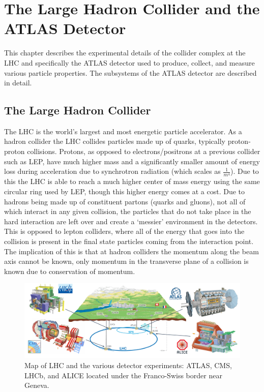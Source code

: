 
\chapter{The Large Hadron Collider and the ATLAS Detector}
\label{ch:LHCDetector}

This chapter describes the experimental details of the collider complex at the LHC and specifically the ATLAS detector used to produce, collect, and measure various particle properties.  The subsystems of the ATLAS detector are described in detail.
\section{The Large Hadron Collider}
\label{Section:LHC}
The LHC is the world's largest and most energetic particle accelerator.  As a hadron collider the LHC collides particles made up of quarks, typically proton-proton collisions.  Protons, as opposed to electrons/positrons at a previous collider such as LEP, have much higher mass and a significantly smaller amount of energy loss during acceleration due to synchrotron radiation (which scales as $\frac{1}{m^4}$).  Due to this the LHC is able to reach a much higher center of mass energy using the same circular ring used by LEP, though this higher energy comes at a cost.  Due to hadrons being made up of constituent partons (quarks and gluons), not all of which interact in any given collision, the particles that do not take place in the hard interaction are left over and create a `messier' environment in the detectors.  This is opposed to lepton colliders, where all of the energy that goes into the collision is present in the final state particles coming from the interaction point.  The implication of this is that at hadron colliders the momentum along the beam axis cannot be known, only momentum in the transverse plane of a collision is known due to conservation of momentum.

\begin{figure}[ht!]
	\centering
	\includegraphics[width=\columnwidth]{../ThesisImages/LHCImages/LHCDetecPlacement.png}
	\caption[Map of LHC and the various detector experiments: ATLAS, CMS, LHCb, and ALICE located under the Franco-Swiss border near Geneva.]{Map of LHC and the various detector experiments: ATLAS, CMS, LHCb, and ALICE  located under the Franco-Swiss border near Geneva\cite{ATLASCoords}.}
	\label{fig:LHCDetPlace}
\end{figure}

